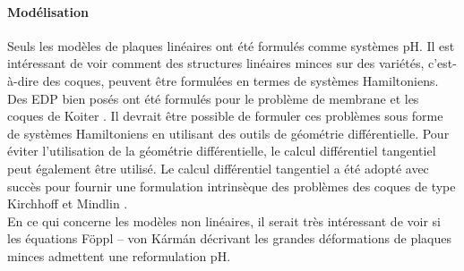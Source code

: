 \paragraph{Modélisation}
Seuls les modèles de plaques linéaires ont été formulés comme systèmes pH. Il est intéressant de voir comment des structures linéaires minces sur des variétés, c'est-à-dire des coques, peuvent être formulées en termes de systèmes Hamiltoniens. Des EDP bien posés ont été formulés pour le problème de membrane et les coques de Koiter \cite{ciarlet2000shells}. Il devrait être possible de formuler ces problèmes sous forme de systèmes Hamiltoniens en utilisant des outils de géométrie différentielle. Pour éviter l'utilisation de la géométrie différentielle, le calcul différentiel tangentiel \cite{delfour2011shapes} peut également être utilisé. Le calcul différentiel tangentiel a été adopté avec succès pour fournir une formulation intrinsèque des problèmes des coques de type Kirchhoff \cite{schollhammer2019kirchhoff} et Mindlin \cite{schollhammer2019reissner}. \\
En ce qui concerne les modèles non linéaires, il serait très intéressant de voir si les équations F\"oppl – von K\'arm\'an décrivant les grandes déformations de plaques minces \cite{bilbao2015conservative} admettent une reformulation pH. \\

